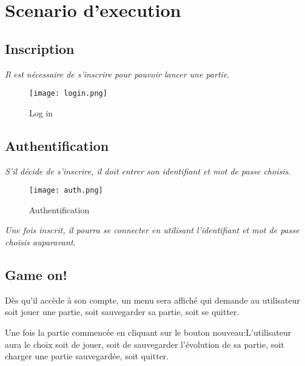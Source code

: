 \documentclass{article}
\begin{document}
\section{Scenario d’execution}
\subsection{Inscription}
\textit{Il est nécessaire de s’inscrire pour pouvoir lancer une partie}.

\begin{figure}[h!]
\centering
\texttt{[image: login.png]}
\caption{Log in}
\label{fig:login}
\end{figure}

\noindent
\newline

\subsection{Authentification}
\textit{S’il décide de s’inscrire, il doit entrer son identifiant et mot de passe choisis}.
\newline
\begin{figure}[h!]
\centering
\texttt{[image: auth.png]}
\caption{Authentification}
\label{fig:sudoku_board}
\end{figure}

\textit{
Une fois inscrit, il pourra se connecter en utilisant l’identifiant et mot de passe choisis auparavant}.
\newline

\subsection{Game on!}
Dès qu’il accède à son compte, un menu sera affiché qui demande au utilisateur soit jouer une partie, soit sauvegarder sa partie, soit se quitter.

Une fois la partie commencée en cliquant sur le bouton nouveau:L’utilisateur aura le choix soit de jouer, soit de sauvegarder l’évolution de sa partie, soit charger une partie sauvegardée, soit quitter.
\end{document}
